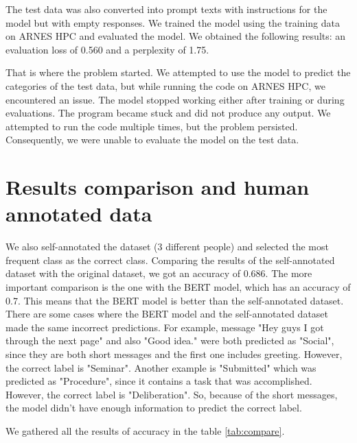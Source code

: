 \documentclass[fleqn,moreauthors,10pt]{ds_report}
\begin{document}
The test data was also converted into prompt texts with instructions for the model but with empty responses. We trained the model using the training data on ARNES HPC and evaluated the model. We obtained the following results: an evaluation loss of 0.560 and a perplexity of 1.75.

That is where the problem started. We attempted to use the model to predict the categories of the test data, but while running the code on ARNES HPC, we encountered an issue. The model stopped working either after training or during evaluations. The program became stuck and did not produce any output. We attempted to run the code multiple times, but the problem persisted. Consequently, we were unable to evaluate the model on the test data.


\section*{Results comparison and human annotated data}

We also self-annotated the dataset (3 different people) and selected the most frequent class as the correct class. 
Comparing the results of the self-annotated dataset with the original dataset, we got an accuracy of 0.686. 
The more important comparison is the one with the BERT model, which has an accuracy of 0.7. 
This means that the BERT model is better than the self-annotated dataset. There are some 
cases where the BERT model and the self-annotated dataset made the same incorrect predictions.
For example, message "Hey guys I got through the next page" and also "Good idea." 
were both predicted as "Social", since they are both short messages and the first 
one includes greeting. However, the correct label is "Seminar".  Another example is
"Submitted" which was predicted as "Procedure", since it contains a task that 
was accomplished. However, the correct label is "Deliberation". So, because of the 
short messages, the model didn't have enough information to predict the correct label.

We gathered all the results of accuracy in the table \ref{tab:compare}.


\begin{table}[htbp]
\vspace{0.2cm}
\caption{Results of the fine-tuned model}
\label{tab:compare}
\end{table}
\end{document}
